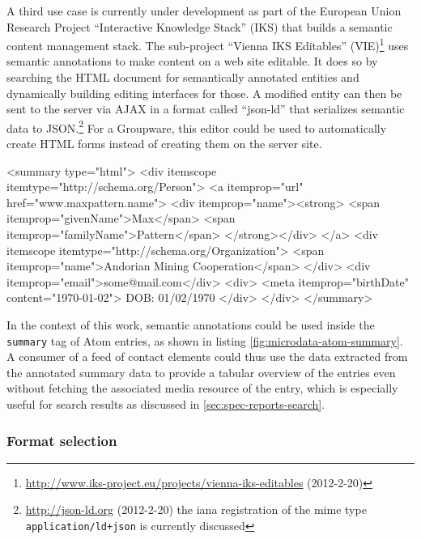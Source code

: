 \documentclass[12pt,a4paper,twoside]{scrartcl}		%
\newcommand{\citeurl}[2]{\url{#1} (#2)}
\begin{document}
A third use case is currently under development as part of the European Union
Research Project ``Interactive Knowledge Stack'' (IKS) that builds a semantic
content management stack. The sub-project ``Vienna IKS Editables''
(VIE)\footnote{\citeurl{http://www.iks-project.eu/projects/vienna-iks-editables}{2012-2-20}}
uses semantic annotations to make content on a web site editable. It does so by
searching the HTML document for semantically annotated entities and dynamically
building editing interfaces for those. A modified entity can then be sent to the
server via AJAX in a format called ``json-ld'' that serializes semantic data to
JSON.\footnote{\citeurl{http://json-ld.org}{2012-2-20} the iana registration of
  the mime type \lstinline:application/ld+json: is currently discussed}
For a Groupware, this editor could be used to automatically create HTML forms instead
of creating them on the server site.

\begin{anylisting}[label=fig:microdata-atom-summary,
                   language=xml,
                   caption={Microdata used in the summary of an ATOM entry summary (markup not escaped for clarity)}]
<summary type="html">
  <div itemscope itemtype="http://schema.org/Person">
    <a itemprop="url" href="www.maxpattern.name">
      <div itemprop="name"><strong>
        <span itemprop="givenName">Max</span>
        <span itemprop="familyName">Pattern</span>
      </strong></div>
    </a>
    <div itemscope itemtype="http://schema.org/Organization">
      <span itemprop="name">Andorian Mining Cooperation</span>
    </div>
    <div itemprop="email">some@mail.com</div>
    <div>
      <meta itemprop="birthDate" content="1970-01-02">
      DOB: 01/02/1970
    </div>
  </div>
</summary>  
\end{anylisting}

In the context of this work, semantic annotations could be used inside the
\lstinline:summary: tag of Atom entries, as shown in listing
\ref{fig:microdata-atom-summary}. A consumer of a feed of contact elements could
thus use the data extracted from the annotated summary data to provide a tabular
overview of the entries even without fetching the associated media resource of
the entry, which is especially useful for search results as discussed in
\autoref{sec:spec-reports-search}.

\subsubsection{Format selection}
\end{document}
